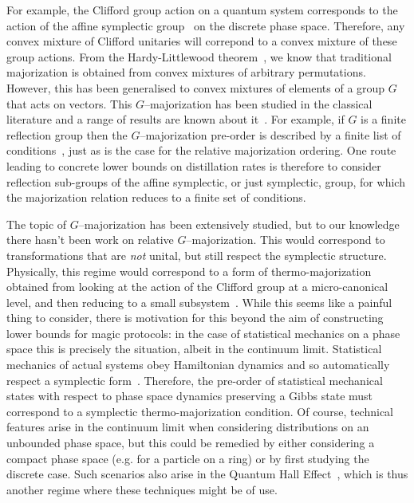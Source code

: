 \documentclass[pra,
aps,
twocolumn,
superscriptaddress,
groupedaddress,
nofootinbib,
reprint
]{revtex4-1}
\begin{document}
For example, the Clifford group action on a quantum system corresponds to the action of the affine symplectic group~\cite{cit:gross3, cit:bengtsson} on the discrete phase space. Therefore, any convex mixture of Clifford unitaries will correpond to a convex mixture of these group actions. From the Hardy-Littlewood theorem~\cite{hardy_1952}, we know that traditional majorization is obtained from convex mixtures of arbitrary permutations. However, this has been generalised to convex mixtures of elements of a group $G$ that acts on vectors. This $G$--majorization has been studied in the classical literature and a range of results are known about it~\cite{giovagnoli_1985, steerneman_1990, eaton_1977}. For example, if $G$ is a finite reflection group then the $G$--majorization pre-order is described by a finite list of conditions~\cite{giovagnoli_1985}, just as is the case for the relative majorization ordering. One route leading to concrete lower bounds on distillation rates is therefore to consider reflection sub-groups of the affine symplectic, or just symplectic, group, for which the majorization relation reduces to a finite set of conditions.
  
The topic of $G$--majorization has been extensively studied, but to our knowledge there hasn't been work on relative $G$--majorization. This would correspond to transformations that are \emph{not} unital, but still respect the symplectic structure. Physically, this regime would correspond to a form of thermo-majorization obtained from looking at the action of the Clifford group at a micro-canonical level, and then reducing to a small subsystem~\cite{cit:lostaglio, Pathria_1997}. While this seems like a painful thing to consider, there is motivation for this beyond the aim of constructing lower bounds for magic protocols: in the case of statistical mechanics on a phase space this is precisely the situation, albeit in the continuum limit. Statistical mechanics of actual systems obey Hamiltonian dynamics and so automatically respect a symplectic form~\cite{Pathria_1997}. Therefore, the pre-order of statistical mechanical states with respect to phase space dynamics preserving a Gibbs state must correspond to a symplectic thermo-majorization condition. Of course, technical features arise in the continuum limit when considering distributions on an unbounded phase space, but this could be remedied by either considering a compact phase space (e.g. for a particle on a ring) or by first studying the discrete case. Such scenarios also arise in the Quantum Hall Effect~\cite{Klitzing_1980}, which is thus another regime where these techniques might be of use.
\end{document}
